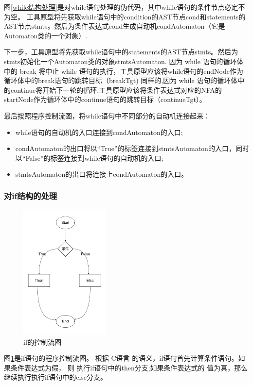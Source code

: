 图\ref{while结构处理}是对while语句处理的伪代码，其中while语句的条件节点必定不为空。
工具原型将先获取while语句中的condition的AST节点cond和statements的AST节点stmts。然后为条件表达式cond生成自动机condAutomaton（它是Automaton类的一个对象）.

下一步，工具原型将先获取while语句中的statements的AST节点stmts。然后为stmts初始化一个Automaton类的对象stmtsAutomaton.
因为 while 语句的循环体中的 break 将中止 while 语句的执行，工具原型应该将while语句的endNode作为循环体中的break语句的跳转目标（breakTgt)
同样的,因为 while 语句的循环体中的continue将开始下一轮的循环,工具原型应该将条件表达式对应的NFA的startNode作为循环体中的continue语句的跳转目标（continueTgt）。

最后按照程序控制流图，将while语句中不同部分的自动机连接起来：
\begin{itemize}
    \item while语句的自动机的入口连接到condAutomaton的入口;
    \item condAutomaton的出口将以“True”的标签连接到stmtsAutomaton的入口，同时以“False”的标签连接到while语句的自动机的入口;
    \item stmtsAutomaton的出口将连接上condAutomaton的入口。
\end{itemize}

\subsubsection{对if结构的处理}

 \begin{figure}[htbp]
	\centering
	\includegraphics[width=0.4\textwidth]{pictures/if结构.pdf}
	\caption{if的控制流图}
	\label{fig:if的控制流图}
\end{figure}

图\ref{fig:if的控制流图}是if语句的程序控制流图。
根据 C语言 的语义，if语句首先计算条件语句。如果条件表达式为假，
则 执行if语句中的then分支;如果条件表达式的
值为真，那么继续执行执行if语句中的else分支。


